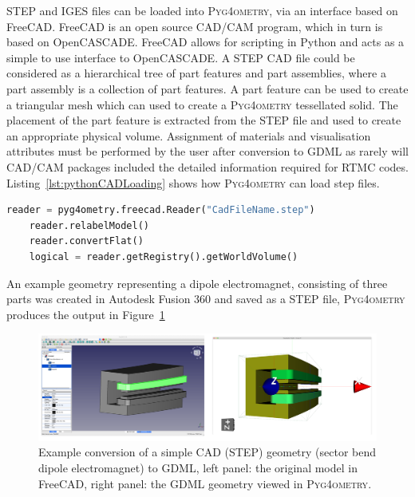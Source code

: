 \documentclass[final,5p,times,twocolumn]{elsarticle}
\newcommand{\PYGEOMETRY}{\textsc{Pyg4ometry}}
\begin{document}
STEP and IGES files can be loaded into 
\PYGEOMETRY{}, via an interface based on FreeCAD. FreeCAD is an 
open source CAD/CAM program, which in turn is based on OpenCASCADE. 
FreeCAD allows for scripting in Python and acts as a simple to use 
interface to OpenCASCADE.  A STEP CAD file could be considered as a 
hierarchical tree of part features and part assemblies, where a part assembly is a 
collection of part features. A part feature can be used to create a triangular mesh 
which can used to create a \PYGEOMETRY{} tessellated solid. The placement 
of the part feature is extracted from the STEP file and used to create an 
appropriate physical volume. Assignment of materials and visualisation 
attributes must be performed by  the user after conversion to GDML as rarely 
will CAD/CAM packages included the detailed information required for RTMC 
codes. Listing~\ref{lst:pythonCADLoading} shows 
how \PYGEOMETRY{} can load step files.
\begin{lstlisting}[caption={A simple \PYGEOMETRY{} Python script to load a STEP file.},label={lst:pythonCADLoading}, language=Python]
    reader = pyg4ometry.freecad.Reader("CadFileName.step")
    reader.relabelModel()
    reader.convertFlat()
    logical = reader.getRegistry().getWorldVolume()
\end{lstlisting}

An example geometry representing a dipole electromagnet, consisting of three parts was created in Autodesk Fusion 360
and saved as a STEP file, \PYGEOMETRY{} produces the output in Figure~\ref{fig:cad-gdml}
\begin{figure}
\begin{center}
\includegraphics[width=1.0\textwidth]{./model-scene/SectorBend.pdf}
\caption{Example conversion of a simple CAD (STEP) geometry (sector bend dipole electromagnet) to GDML, left panel:  
the original model in FreeCAD, right panel: the GDML geometry 
viewed in \PYGEOMETRY{}. }
\label{fig:cad-gdml}
\end{center}
\end{figure}
\end{document}
